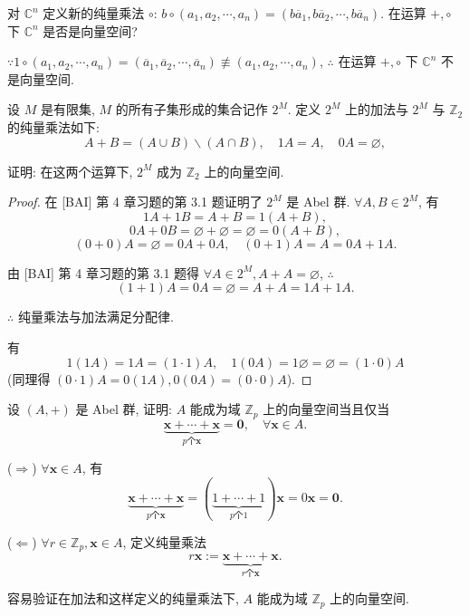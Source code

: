 \documentclass[color=black,device=normal,lang=cn,mode=geye]{elegantnote}
\begin{document}
\begin{exercisec}[1.1.11]
    对 $\mathbb{C}^n$ 定义新的纯量乘法 $\circ$: $b\circ(a_1,a_2,\cdots,a_n)=(b\overline{a}_1,b\overline{a}_2,\cdots,b\overline{a}_n)$. 在运算 $+,\circ$ 下 $\mathbb{C}^n$ 是否是向量空间?
\end{exercisec}
\begin{solution}
    $\because 1\circ(a_1,a_2,\cdots,a_n)=(\overline{a}_1,\overline{a}_2,\cdots,\overline{a}_n)\not\equiv(a_1,a_2,\cdots,a_n)$, $\therefore$ 在运算 $+,\circ$ 下 $\mathbb{C}^n$ 不是向量空间.
\end{solution}
\begin{exercisec}[1.1.12]
    设 $M$ 是有限集, $M$ 的所有子集形成的集合记作 $2^M$. 定义 $2^M$ 上的加法与 $2^M$ 与 $\mathbb{Z}_2$ 的纯量乘法如下:
    \[A+B=(A\cup B)\backslash(A\cap B),\quad 1A=A,\quad0A=\varnothing,\]

    证明: 在这两个运算下, $2^M$ 成为 $\mathbb{Z}_2$ 上的向量空间.
\end{exercisec}
\begin{proof}
    在 [BAI] 第 4 章习题的第 3.1 题证明了 $2^M$ 是 Abel 群. $\forall A,B\in2^M$, 有
    \[1A+1B=A+B=1(A+B),\]
    \[0A+0B=\varnothing+\varnothing=\varnothing=0(A+B),\]
    \[(0+0)A=\varnothing=0A+0A,\quad(0+1)A=A=0A+1A.\]

    由 [BAI] 第 4 章习题的第 3.1 题得 $\forall A\in2^M,A+A=\varnothing$, $\therefore$
    \[(1+1)A=0A=\varnothing=A+A=1A+1A.\]

    $\therefore$ 纯量乘法与加法满足分配律.

    有
    \[1(1A)=1A=(1\cdot1)A,\quad1(0A)=1\varnothing=\varnothing=(1\cdot0)A\]
    (同理得 $(0\cdot1)A=0(1A),0(0A)=(0\cdot0)A$).
\end{proof}
\begin{exercisec}[1.1.13]
    设 $(A,+)$ 是 Abel 群, 证明: $A$ 能成为域 $\mathbb{Z}_p$ 上的向量空间当且仅当
    \[\underbrace{\boldsymbol{x}+\cdots+\boldsymbol{x}}_{p\text{个}\boldsymbol{x}}=\boldsymbol{0},\quad\forall\boldsymbol{x}\in A.\]
\end{exercisec}
\begin{solution}
    ($\Rightarrow$) $\forall\boldsymbol{x}\in A$, 有
    \[\underbrace{\boldsymbol{x}+\cdots+\boldsymbol{x}}_{p\text{个}\boldsymbol{x}}=(\underbrace{1+\cdots+1}_{p\text{个}1})\boldsymbol{x}=0\boldsymbol{x}=\boldsymbol{0}.\]

    ($\Leftarrow$) $\forall r\in\mathbb{Z}_p,\boldsymbol{x}\in A$, 定义纯量乘法
    \[r\boldsymbol{x}:=\underbrace{\boldsymbol{x}+\cdots+\boldsymbol{x}}_{r\text{个}\boldsymbol{x}}.\]

    容易验证在加法和这样定义的纯量乘法下, $A$ 能成为域 $\mathbb{Z}_p$ 上的向量空间.
\end{solution}
\end{document}
